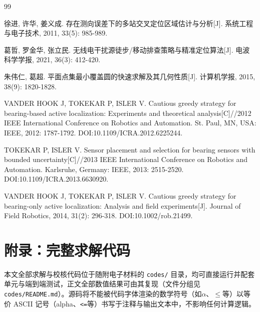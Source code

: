 \documentclass[withoutpreface]{cumcmthesis}
\begin{document}
\begin{thebibliography}{99}

 徐进, 许华, 姜义成. 存在测向误差下的多站交叉定位区域估计与分析[J]. 系统工程与电子技术, 2011, 33(5): 985-989.

 葛哲, 罗金华, 张立民. 无线电干扰源徒步/移动排查策略与精准定位算法[J]. 电波科学学报, 2021, 36(3): 412-420.

 朱伟仁, 葛超. 平面点集最小覆盖圆的快速求解及其几何性质[J]. 计算机学报, 2015, 38(9): 1820-1828.

 VANDER HOOK J, TOKEKAR P, ISLER V. Cautious greedy strategy for bearing-based active localization: Experiments and theoretical analysis[C]//2012 IEEE International Conference on Robotics and Automation. St. Paul, MN, USA: IEEE, 2012: 1787-1792. DOI:10.1109/ICRA.2012.6225244.

 TOKEKAR P, ISLER V. Sensor placement and selection for bearing sensors with bounded uncertainty[C]//2013 IEEE International Conference on Robotics and Automation. Karlsruhe, Germany: IEEE, 2013: 2515-2520. DOI:10.1109/ICRA.2013.6630920.

 VANDER HOOK J, TOKEKAR P, ISLER V. Cautious greedy strategy for bearing-only active localization: Analysis and field experiments[J]. Journal of Field Robotics, 2014, 31(2): 296-318. DOI:10.1002/rob.21499.

\end{thebibliography}

\appendix
\section{附录：完整求解代码}

本文全部求解与校核代码位于随附电子材料的 \texttt{codes/} 目录，均可直接运行并配套单元与端到端测试，正文全部数值结果可由其复现（文件分组见 \texttt{codes/README.md}）。源码将不能被代码字体渲染的数学符号（如$\alpha$、$\le$等）以等价 ASCII 记号（alpha、\texttt{<=}等）书写于注释与输出文本中，不影响任何计算逻辑。
\end{document}
